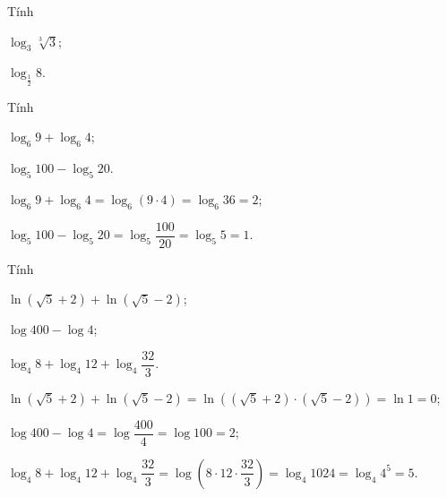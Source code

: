 \begin{bt}%
	Tính
	\begin{listEX}[2]
		\item[a)] $ \log_3 \sqrt[3]{3}$;
		\item[b)] $ \log_{\frac{1}{2}} 8 $.
	\end{listEX}
\end{bt}

\begin{bt}%

	Tính
	\begin{listEX}[2]
		\item  $\log _{6} 9+\log _{6} 4$;
		\item $\log _{5} 100-\log _{5} 20$.
	\end{listEX}
	\loigiai
	{\begin{listEX}[1]
			\item $\log _{6} 9+\log _{6} 4=\log _{6}(9\cdot 4)=\log _{6} 36=2$;
			\item $\log _{5} 100-\log _{5} 20=\log _{5} \dfrac{100}{20}=\log _{5} 5=1$.
		\end{listEX}
	}
\end{bt}

\begin{bt}%

	Tính
	\begin{listEX}[2]
		\item  $\ln \left(\sqrt{5}+2\right)+\ln \left(\sqrt{5}-2\right)$;
		\item $\log 400-\log 4$;
		\item $\log _{4} 8+\log _{4} 12+\log _{4} \dfrac{32}{3}$.
	\end{listEX}
	\loigiai
	{\begin{listEX}[1]
			\item $\ln \left(\sqrt{5}+2\right)+\ln \left(\sqrt{5}-2\right)=\ln \left(\left(\sqrt{5}+2\right)\cdot \left(\sqrt{5}-2\right)\right)=\ln 1=0$;
			\item $\log 400-\log 4=\log\dfrac{400}{4}=\log 100=2$;
			\item $\log _{4} 8+\log _{4} 12+\log _{4} \dfrac{32}{3}=\log \left(8\cdot 12\cdot \dfrac{32}{3}\right)=\log_4 1024=\log_4 4^5=5$.
		\end{listEX}
	}
\end{bt}


